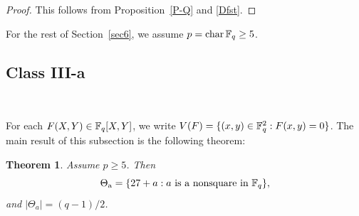 \documentclass{amsart}
\newtheorem{thm}{Theorem}[section]
\numberwithin{equation}{section}
\theoremstyle{definition}
\newcommand{\f}{\Bbb F}
\newcommand{\ch}{\text{\rm char\,}}
\begin{document}
\begin{proof}
This follows from Proposition~\ref{P-Q} and \eqref{Dfst}.
\end{proof}

For the rest of Section~\ref{sec6}, we assume $p=\ch\f_q\ge 5$.

\subsection{Class III-a}\label{sec6.4}\

For each $F(X,Y)\in\f_q[X,Y]$, we write $V(F)=\{(x,y)\in\f_q^2:F(x,y)=0\}$.
The main result of this subsection is the following theorem:

\begin{thm}\label{C-tha1}
Assume $p\ge 5$. Then 
\begin{equation}\label{thaa}
\Theta_{\rm a}=\{27+a: \text{\rm $a$ is a nonsquare in $\f_q$}\},
\end{equation}
and $|\Theta_a|=(q-1)/2$.
\end{thm}
\end{document}
